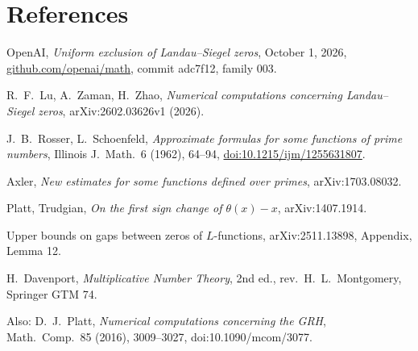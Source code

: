 \documentclass[11pt]{article}
\begin{document}
\section*{References}
\begin{enumerate}[label={[S\arabic*]}]
\item OpenAI, \emph{Uniform exclusion of Landau--Siegel zeros}, October 1, 2026, \url{github.com/openai/math}, commit adc7f12, family 003.
\item R.~F.~Lu, A.~Zaman, H.~Zhao, \emph{Numerical computations concerning Landau--Siegel zeros}, arXiv:2602.03626v1 (2026).
\item J.~B.~Rosser, L.~Schoenfeld, \emph{Approximate formulas for some functions of prime numbers}, Illinois J.\ Math.\ 6 (1962), 64--94, \url{doi:10.1215/ijm/1255631807}.
\item Axler, \emph{New estimates for some functions defined over primes}, arXiv:1703.08032.
\item Platt, Trudgian, \emph{On the first sign change of $\theta(x)-x$}, arXiv:1407.1914.
\item Upper bounds on gaps between zeros of $L$-functions, arXiv:2511.13898, Appendix, Lemma 12.
\item H.~Davenport, \emph{Multiplicative Number Theory}, 2nd ed., rev.\ H.~L.~Montgomery, Springer GTM 74.
\end{enumerate}
\noindent Also: D.~J.~Platt, \emph{Numerical computations concerning the GRH}, Math.\ Comp.\ 85 (2016), 3009--3027, doi:10.1090/mcom/3077.
\end{document}
